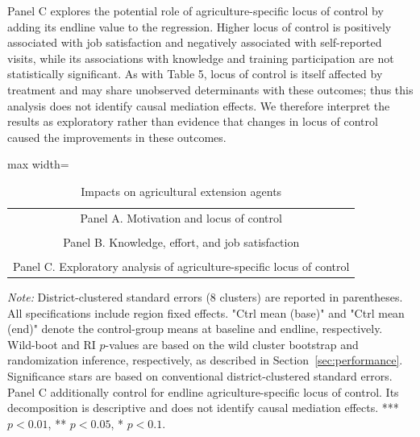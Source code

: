 \documentclass[11pt]{article}
\makeatletter
\newenvironment{panels}
  {\par\centering\begin{adjustbox}{max width=\linewidth}\scriptsize\begin{tabular}{@{}c@{}}}
  {\end{tabular}\end{adjustbox}\par}
\newcommand{\panel}[1]{\rule{0pt}{20pt}\small{#1}\\[6pt]}
\newcommand{\tnote}[1]{%
  \par\vspace{3pt}%
  \noindent\begin{minipage}{\linewidth}%
    \scriptsize\setlength{\parindent}{0pt}\textit{Note:} #1%
  \end{minipage}}
\makeatother
\begin{document}
Panel C explores the potential role of agriculture-specific locus of control by adding its endline value to the regression. Higher locus of control is positively associated with job satisfaction and negatively associated with self-reported visits, while its associations with knowledge and training participation are not statistically significant. As with Table 5, locus of control is itself affected by treatment and may share unobserved determinants with these outcomes; thus this analysis does not identify causal mediation effects. We therefore interpret the results as exploratory rather than evidence that changes in locus of control caused the improvements in these outcomes.


\begin{table}[H]
\caption{Impacts on agricultural extension agents}
\label{tab:aeaimpact}
\begin{panels}
\panel{Panel A. Motivation and locus of control}
\\[18pt]
\panel{Panel B. Knowledge, effort, and job satisfaction}
\\[18pt]
\panel{Panel C. Exploratory analysis of agriculture-specific locus of control}

\end{panels}
\tnote{District-clustered standard errors (8 clusters) are reported in parentheses. All specifications include region fixed effects. "Ctrl mean (base)" and "Ctrl mean (end)" denote the control-group means at baseline and endline, respectively. Wild-boot and RI $p$-values are based on the wild cluster bootstrap and randomization inference, respectively, as described in Section~\ref{sec:performance}. Significance stars are based on conventional district-clustered standard errors. Panel C additionally control for endline agriculture-specific locus of control. Its decomposition is descriptive and does not identify causal mediation effects. *** $p<0.01$, ** $p<0.05$, * $p<0.1$.}
\end{table}

\end{document}
